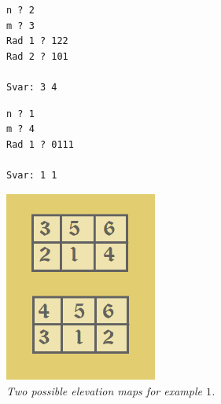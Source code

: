 \setlength\columnsep{30pt}
\begin{multicols}{2}

\begin{verbatim}
n ? 2
m ? 3
Rad 1 ? 122
Rad 2 ? 101

Svar: 3 4
\end{verbatim}

\vspace{0.5cm}
\begin{verbatim}
n ? 1
m ? 4
Rad 1 ? 0111

Svar: 1 1
\end{verbatim}

\vfill\columnbreak
\begin{center}
  \includegraphics[width=5cm]{../skolkval/bergskedja/problem_statement/berg_sample}\\
  \emph{Two possible elevation maps for example $1$.}
\end{center}
\vfill
\end{multicols}





